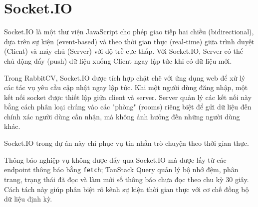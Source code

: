 



\section{Socket.IO}

Socket.IO là một thư viện JavaScript cho phép giao tiếp hai chiều (bidirectional), dựa trên sự kiện (event-based) và theo thời gian thực (real-time) giữa trình duyệt (Client) và máy chủ (Server) với độ trễ cực thấp. Với Socket.IO, Server có thể chủ động đẩy (push) dữ liệu xuống Client ngay lập tức khi có dữ liệu mới.

Trong RabbitCV, Socket.IO được tích hợp chặt chẽ với ứng dụng web để xử lý các tác vụ yêu cầu cập nhật ngay lập tức. Khi một người dùng đăng nhập, một kết nối socket được thiết lập giữa client và server. Server quản lý các kết nối này bằng cách phân loại chúng vào các "phòng" (rooms) riêng biệt để gửi dữ liệu đến chính xác người dùng cần nhận, mà không ảnh hưởng đến những người dùng khác.

Socket.IO trong dự án này chỉ phục vụ tin nhắn trò chuyện theo thời gian thực.

Thông báo nghiệp vụ không được đẩy qua Socket.IO mà được lấy từ các endpoint thông báo bằng \texttt{fetch}; TanStack Query quản lý bộ nhớ đệm, phân trang, trạng thái đã đọc và làm mới số thông báo chưa đọc theo chu kỳ 30 giây. Cách tách này giúp phân biệt rõ kênh sự kiện thời gian thực với cơ chế đồng bộ dữ liệu định kỳ.

